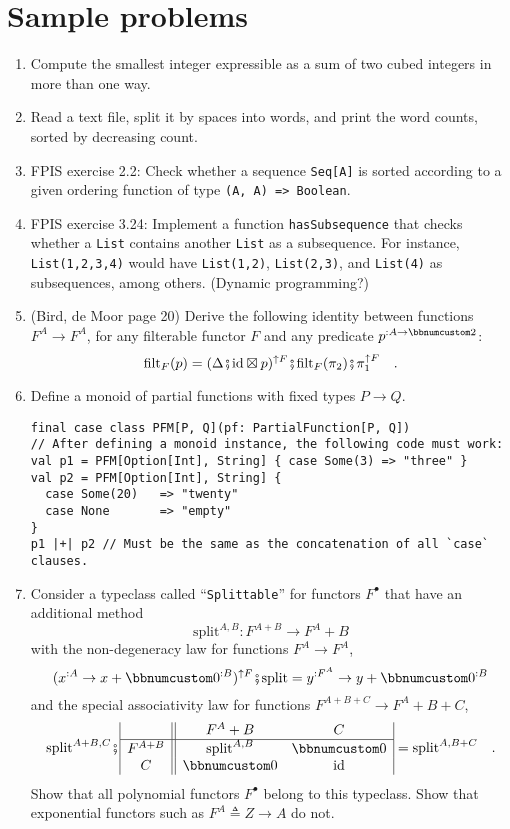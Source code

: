 
\chapter{Sample problems}
\begin{enumerate}
\item Compute the smallest integer expressible as a sum of two cubed integers
in more than one way.
\item Read a text file, split it by spaces into words, and print the word
counts, sorted by decreasing count.
\item FPIS exercise 2.2: Check whether a sequence \lstinline!Seq[A]! is
sorted according to a given ordering function of type \lstinline!(A, A) => Boolean!.
\item FPIS exercise 3.24: Implement a function \lstinline!hasSubsequence!
that checks whether a \lstinline!List! contains another \lstinline!List!
as a subsequence. For instance, \lstinline!List(1,2,3,4)! would have
\lstinline!List(1,2)!, \lstinline!List(2,3)!, and \lstinline!List(4)!
as subsequences, among others. (Dynamic programming?)
\item (Bird, de Moor page 20) Derive the following identity between functions
$F^{A}\rightarrow F^{A}$, for any filterable functor $F$ and any
predicate $p^{:A\rightarrow\bbnum 2}$: 
\[
\text{filt}_{F}(p)=(\Delta\bef\text{id}\boxtimes p)^{\uparrow F}\bef\text{filt}_{F}(\pi_{2})\bef\pi_{1}^{\uparrow F}\quad.
\]
\item Define a monoid of partial functions with fixed types $P\rightarrow Q$.
\begin{lstlisting}
final case class PFM[P, Q](pf: PartialFunction[P, Q])
// After defining a monoid instance, the following code must work:
val p1 = PFM[Option[Int], String] { case Some(3) => "three" }
val p2 = PFM[Option[Int], String] {
  case Some(20)   => "twenty"
  case None       => "empty"
}
p1 |+| p2 // Must be the same as the concatenation of all `case` clauses.
\end{lstlisting}
\item Consider a typeclass called \textsf{``}\lstinline!Splittable!\textsf{''} for functors
$F^{\bullet}$ that have an additional method 
\[
\text{split}^{A,B}:F^{A+B}\rightarrow F^{A}+B
\]
with the non-degeneracy law for functions $F^{A}\rightarrow F^{A}$,
\[
(x^{:A}\rightarrow x+\bbnum 0^{:B})^{\uparrow F}\bef\text{split}=y^{:F^{A}}\rightarrow y+\bbnum 0^{:B}
\]
and the special associativity law for functions $F^{A+B+C}\rightarrow F^{A}+B+C$,
\[
\text{split}^{A+B,C}\bef\begin{array}{|c||cc|}
 & F^{A}+B & C\\
\hline F^{A+B} & \text{split}^{A,B} & \bbnum 0\\
C & \bbnum 0 & \text{id}
\end{array}=\text{split}^{A,B+C}\quad.
\]
Show that all polynomial functors $F^{\bullet}$ belong to this typeclass.
Show that exponential functors such as $F^{A}\triangleq Z\rightarrow A$
do not. 
\end{enumerate}

